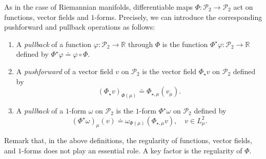 \documentclass[sn-mathphys-num]{sn-jnl}
\numberwithin{equation}{section}
\theoremstyle{mythm}
\theoremstyle{mydef}
\renewcommand{\phi}{\varphi}
\begin{document}
As in the case of Riemannian manifolds, differentiable maps \( \Phi \colon \mathcal{P}_2 \to \mathcal{P}_2 \) act on functions, vector fields and \( 1 \)-forms. Precisely, we can introduce the corresponding pushforward and pullback operations as follows:
  \begin{enumerate}
    \item A \emph{pullback} of a function \( \phi\colon \mathcal{P}_2 \to \mathbb{R}\) through $\Phi$ is the function \( \Phi^{\star}\phi\colon \mathcal{P}_2\to \mathbb{R} \) defined by \( \Phi^{\star}\phi\doteq \phi\circ \Phi \).
    \item A \emph{pushforward} of a vector field \( v \) on \( \mathcal{P}_2 \) is the vector field \( \Phi_{\star}v \) on \( \mathcal{P}_2 \) defined by
    \[
    (\Phi_{\star} v)_{\Phi(\mu)} \doteq \Phi_{\star,\mu}(v_{\mu}).
    \]

    \item A \emph{pullback} of a \( 1 \)-form \( \omega \) on \( \mathcal{P}_2 \) is the \( 1 \)-form \( \Phi^{\star}\omega \) on \( \mathcal{P}_2 \) defined by
  \[
    (\Phi^{\star}\omega)_\mu(v) \doteq \omega_{\Phi(\mu)}(\Phi_{\star,\mu}v), \quad v\in L_{\mu}^2.
  \]
  \end{enumerate}
  
  Remark that, in the above definitions, the regularity of functions, vector fields, and \( 1 \)-forms does not play an essential role. A key factor is the regularity of \( \Phi \).
\end{document}
